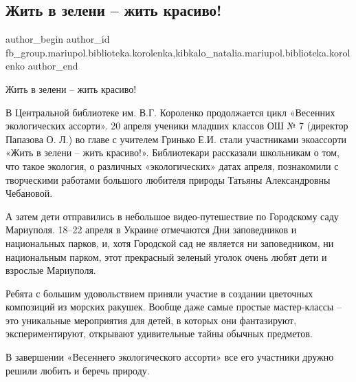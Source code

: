  
 
 
 
 

\subsection{Жить в зелени – жить красиво!}
\label{sec:20_04_2018.fb.fb_group.mariupol.biblioteka.korolenka.1.zhit_v_zeleni___zhit}
 
\ifcmt
 author_begin
   author_id fb_group.mariupol.biblioteka.korolenka,kibkalo_natalia.mariupol.biblioteka.korolenko
 author_end
\fi

Жить в зелени – жить красиво!

В Центральной библиотеке им. В.Г. Короленко продолжается цикл «Весенних
экологических ассорти». 20 апреля ученики младших классов ОШ № 7 (директор
Папазова О. Л.) во главе с учителем Гринько Е.И.  стали участниками экоассорти
«Жить в зелени – жить красиво!». Библиотекари рассказали школьникам о том, что
такое экология, о различных «экологических» датах апреля, познакомили с
творческими работами большого любителя природы Татьяны Александровны Чебановой. 

А затем дети отправились в небольшое видео-путешествие по Городскому саду
Мариуполя. 18–22 апреля в Украине отмечаются Дни заповедников и национальных
парков, и, хотя Городской сад не является ни заповедником, ни национальным
парком, этот прекрасный зеленый уголок очень любят дети и взрослые Мариуполя.

Ребята с большим удовольствием приняли участие в создании цветочных композиций
из морских ракушек. Вообще даже самые простые мастер-классы – это уникальные
мероприятия для детей, в которых они фантазируют, экспериментируют, открывают
удивительные тайны обычных предметов.

В завершении «Весеннего экологического ассорти»  все его участники дружно
решили любить и беречь природу.
